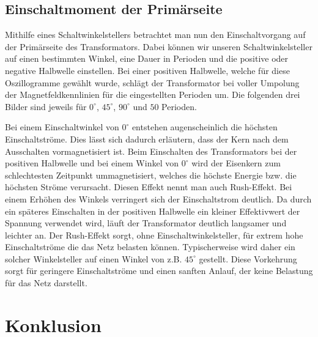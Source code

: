 \documentclass{article}
\begin{document}
\subsection{Einschaltmoment der Primärseite}
\label{sec:einsch-der-prim}

Mithilfe eines Schaltwinkelstellers betrachtet man nun den Einschaltvorgang auf der Primärseite des Transformators. Dabei können wir unseren Schaltwinkelsteller auf einen bestimmten Winkel, eine Dauer in Perioden und die positive oder negative Halbwelle einstellen.
Bei einer positiven Halbwelle, welche für diese Oszillogramme gewählt wurde, schlägt der Transformator bei voller Umpolung der Magnetfeldkennlinien für die eingestellten Perioden um. Die folgenden drei Bilder sind jeweils für $0^{\circ}$, $45^{\circ}$, $90^{\circ}$ und $50$ Perioden.



Bei einem Einschaltwinkel von $0^{\circ}$ entstehen augenscheinlich die höchsten Einschaltströme. Dies lässt sich dadurch erläutern, dass der Kern nach dem Ausschalten vormagnetisiert ist. Beim Einschalten des Transformators bei der positiven Halbwelle und bei einem Winkel von $0^{\circ}$ wird der Eisenkern zum schlechtesten Zeitpunkt ummagnetisiert, welches die höchste Energie bzw. die höchsten Ströme verursacht. Diesen Effekt nennt man auch Rush-Effekt. Bei einem Erhöhen des Winkels verringert sich der Einschaltstrom deutlich. Da durch ein späteres Einschalten in der positiven Halbwelle ein kleiner Effektivwert der Spannung verwendet wird, läuft der Transformator deutlich langsamer und leichter an. Der Rush-Effekt sorgt, ohne Einschaltwinkelsteller, für extrem hohe Einschaltströme die das Netz belasten können. Typischerweise wird daher ein solcher Winkelsteller auf einen Winkel von z.B. $45^{\circ}$ gestellt. Diese Vorkehrung sorgt für geringere Einschaltströme und einen sanften Anlauf, der keine Belastung für das Netz darstellt.
\section{Konklusion}
\label{sec:konklusion}
\end{document}
